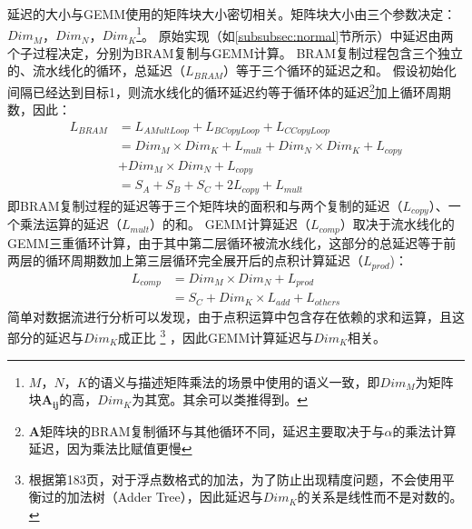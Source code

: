 延迟的大小与GEMM使用的矩阵块大小密切相关。矩阵块大小由三个参数决定：$Dim_M$，$Dim_N$，$Dim_K$\footnote{$M$，$N$，$K$的语义与描述矩阵乘法的场景中使用的语义一致，即$Dim_M$为矩阵块$\mathbf{A_{ij}}$的高，$Dim_K$为其宽。其余可以类推得到。}。
原始实现（如\ref{subsubsec:normal}节所示）中延迟由两个子过程决定，分别为BRAM复制与GEMM计算。
BRAM复制过程包含三个独立的、流水线化的循环，总延迟（\(\mathit{L_{BRAM}}\)）等于三个循环的延迟之和。
假设初始化间隔已经达到目标1，则流水线化的循环延迟约等于循环体的延迟\footnote{\(\mathbf{A}\)矩阵块的BRAM复制循环与其他循环不同，延迟主要取决于与\(\alpha\)的乘法计算延迟，因为乘法比赋值更慢}加上循环周期数，因此：
\begin{equation}\label{eq:bramcopylatency}
\begin{aligned}
\mathit{L_{BRAM}}
& = \mathit{L_{AMultLoop}+L_{BCopyLoop}+L_{CCopyLoop}} \\
& = \mathit{Dim_M\times Dim_K + L_{mult}} 
  + \mathit{Dim_N\times Dim_K + L_{copy}} \\
& + \mathit{Dim_M\times Dim_N + L_{copy}} \\
& = \mathit{S_A + S_B + S_C + 2L_{copy} + L_{mult}} 
\end{aligned}
\end{equation}
即BRAM复制过程的延迟等于三个矩阵块的面积和与两个复制的延迟（\(\mathit{L_{copy}}\)）、一个乘法运算的延迟（\(\mathit{L_{mult}}\)）的和。
GEMM计算延迟（\(\mathit{L_{comp}}\)）取决于流水线化的GEMM三重循环计算，由于其中第二层循环被流水线化，这部分的总延迟等于前两层的循环周期数加上第三层循环完全展开后的点积计算延迟（\(\mathit{L_{prod}}\))：
\begin{equation}\label{eq:complatency}
\begin{aligned}
\mathit{L_{comp}}
& = \mathit{Dim_M \times Dim_N + L_{prod}} \\
& = \mathit{S_C + Dim_K \times L_{add} + L_{others}}
\end{aligned}
\end{equation}
简单对数据流进行分析可以发现，由于点积运算中包含存在依赖的求和运算，且这部分的延迟与\(\mathit{Dim_K}\)成正比
\footnote{根据\cite{ug902}第183页，对于浮点数格式的加法，为了防止出现精度问题，不会使用平衡过的加法树（Adder Tree），因此延迟与\(Dim_K\)的关系是线性而不是对数的。}
，因此GEMM计算延迟与\(\mathit{Dim_K}\)相关。

